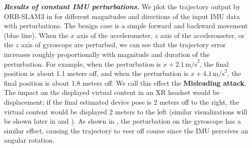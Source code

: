 \textbf{\emph{Results of constant IMU perturbations.}}
We plot the trajectory output by ORB-SLAM3 in  for different magnitudes and directions of the input IMU data with perturbations.
The benign case is a simple forward and backward movement (blue line).
When the $x$ axis of the accelerometer, $z$ axis of the accelerometer, or the $z$ axis of gyroscope are perturbed,
we can see that the trajectory error increases roughly proportionally with magnitude and duration of the perturbation.
For example, when the perturbation is $x+2.1\,\text{m/s}^2$, the final position is about 1.1 meters off, and when the perturbation is $x+4.1\,\text{m/s}^2$, the final position is about 1.8 meters off. %
We call this effect the \textbf{Misleading attack}.
The impact on the displayed virtual content in an XR headset would be displacement; \eg if the final estimated device pose is 2 meters off to the right, the virtual content would be displayed 2 meters to the left (similar visualizations will be shown later in  and ). As shown in , the perturbation on the gyroscope has a similar effect, causing the trajectory to veer off course since the IMU perceives an angular rotation. 

